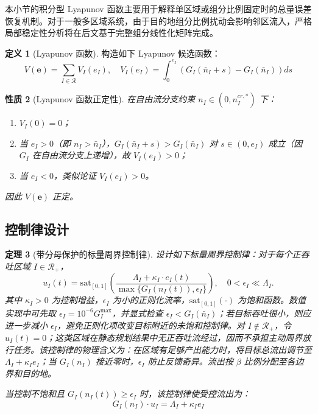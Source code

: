 \documentclass[a4paper,12pt]{article}
\theoremstyle{plain}
\newtheorem{theorem}{定理}[section]
\newtheorem{property}[theorem]{性质}
\theoremstyle{definition}
\newtheorem{definition}[theorem]{定义}
\theoremstyle{remark}
\begin{document}
本小节的积分型 Lyapunov 函数主要用于解释单区域或组分比例固定时的总量误差恢复机制。对于一般多区域系统，由于目的地组分比例扰动会影响邻区流入，严格局部稳定性分析将在后文基于完整组分线性化矩阵完成。

\begin{definition}[Lyapunov 函数]\label{def:lyapunov}
构造如下 Lyapunov 候选函数：
\begin{equation}\label{eq:lyapunov}
    V(\bm{e}) = \sum_{I \in \mathcal{R}} V_I(e_I), \quad V_I(e_I) = \int_0^{e_I} \left( G_I(\bar{n}_I + s) - G_I(\bar{n}_I) \right) ds
\end{equation}
\end{definition}

\begin{property}[Lyapunov 函数正定性]\label{prop:lyapunov_positive}
在自由流分支约束 $n_I \in (0, n_I^{cr,*})$ 下：
\begin{enumerate}
    \item $V_I(0) = 0$；
    \item 当 $e_I > 0$（即 $n_I > \bar{n}_I$），$G_I(\bar{n}_I + s) > G_I(\bar{n}_I)$ 对 $s \in (0, e_I)$ 成立（因 $G_I$ 在自由流分支上递增），故 $V_I(e_I) > 0$；
    \item 当 $e_I < 0$，类似论证 $V_I(e_I) > 0$。
\end{enumerate}
因此 $V(\bm{e})$ 正定。
\end{property}

\subsection{控制律设计}

\begin{theorem}[带分母保护的标量周界控制律]\label{thm:control_law}
设计如下标量周界控制律：对于每个正吞吐区域 $I \in \mathcal{R}_+$，
\begin{equation}\label{eq:control_law}
    u_I(t) = \text{sat}_{[0,1]}\left( \frac{\Lambda_I + \kappa_I \cdot e_I(t)}{\max\{G_I(n_I(t)),\epsilon_I\}} \right),
    \quad 0<\epsilon_I\ll \Lambda_I .
\end{equation}
其中 $\kappa_I > 0$ 为控制增益，$\epsilon_I$ 为小的正则化流率，$\text{sat}_{[0,1]}(\cdot)$ 为饱和函数。数值实现中可先取 $\epsilon_I=10^{-6}G_I^{\max}$，并显式检查 $\epsilon_I<G_I(\bar n_I)$；若目标吞吐很小，则应进一步减小 $\epsilon_I$，避免正则化项改变目标附近的未饱和控制律。对 $I\notin\mathcal R_+$，令 $u_I(t)=0$；这类区域在静态规划结果中无正吞吐流经过，因而不承担主动周界放行任务。该控制律的物理含义为：在区域有足够产出能力时，将目标总流出调节至 $\Lambda_I+\kappa_I e_I$；当 $G_I(n_I)$ 接近零时，$\epsilon_I$ 防止反馈奇异。流出按 $\beta$ 比例分配至各边界和目的地。

当控制不饱和且 $G_I(n_I(t))\ge \epsilon_I$ 时，该控制律使受控流出为：
\begin{equation}\label{eq:controlled_outflow}
    G_I(n_I) \cdot u_I = \Lambda_I + \kappa_I e_I
\end{equation}
\end{theorem}
\end{document}
